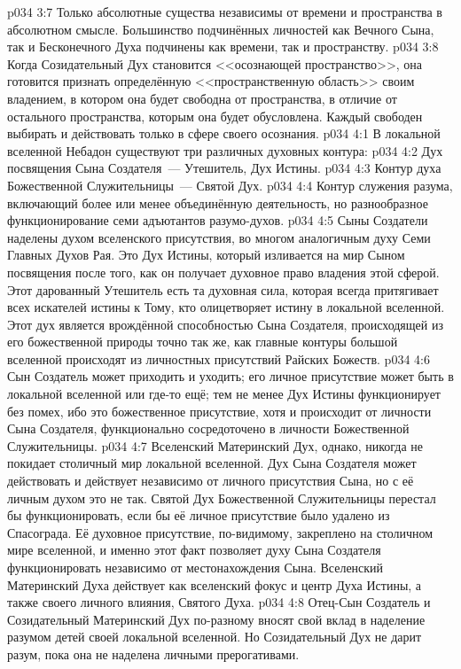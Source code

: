 \vs p034 3:7 \pc Только абсолютные существа независимы от времени и пространства в абсолютном смысле. Большинство подчинённых личностей как Вечного Сына, так и Бесконечного Духа подчинены как времени, так и пространству.
\vs p034 3:8 Когда Созидательный Дух становится <<осознающей пространство>>, она готовится признать определённую <<пространственную область>> своим владением, в котором она будет свободна от пространства, в отличие от остального пространства, которым она будет обусловлена. Каждый свободен выбирать и действовать только в сфере своего осознания.
\vs p034 4:1 В локальной вселенной Небадон существуют три различных духовных контура:
\vs p034 4:2 Дух посвящения Сына Создателя~--- Утешитель, Дух Истины.
\vs p034 4:3 Контур духа Божественной Служительницы~--- Святой Дух.
\vs p034 4:4 Контур служения разума, включающий более или менее объединённую деятельность, но разнообразное функционирование семи адъютантов разумо\hyp{}духов.
\vs p034 4:5 \pc Сыны Создатели наделены духом вселенского присутствия, во многом аналогичным духу Семи Главных Духов Рая. Это Дух Истины, который изливается на мир Сыном посвящения после того, как он получает духовное право владения этой сферой. Этот дарованный Утешитель есть та духовная сила, которая всегда притягивает всех искателей истины к Тому, кто олицетворяет истину в локальной вселенной. Этот дух является врождённой способностью Сына Создателя, происходящей из его божественной природы точно так же, как главные контуры большой вселенной происходят из личностных присутствий Райских Божеств.
\vs p034 4:6 Сын Создатель может приходить и уходить; его личное присутствие может быть в локальной вселенной или где-то ещё; тем не менее Дух Истины функционирует без помех, ибо это божественное присутствие, хотя и происходит от личности Сына Создателя, функционально сосредоточено в личности Божественной Служительницы.
\vs p034 4:7 Вселенский Материнский Дух, однако, никогда не покидает столичный мир локальной вселенной. Дух Сына Создателя может действовать и действует независимо от личного присутствия Сына, но с её личным духом это не так. Святой Дух Божественной Служительницы перестал бы функционировать, если бы её личное присутствие было удалено из Спасограда. Её духовное присутствие, по\hyp{}видимому, закреплено на столичном мире вселенной, и именно этот факт позволяет духу Сына Создателя функционировать независимо от местонахождения Сына. Вселенский Материнский Духа действует как вселенский фокус и центр Духа Истины, а также своего личного влияния, Святого Духа.
\vs p034 4:8 \pc Отец-Сын Создатель и Созидательный Материнский Дух по\hyp{}разному вносят свой вклад в наделение разумом детей своей локальной вселенной. Но Созидательный Дух не дарит разум, пока она не наделена личными прерогативами.
